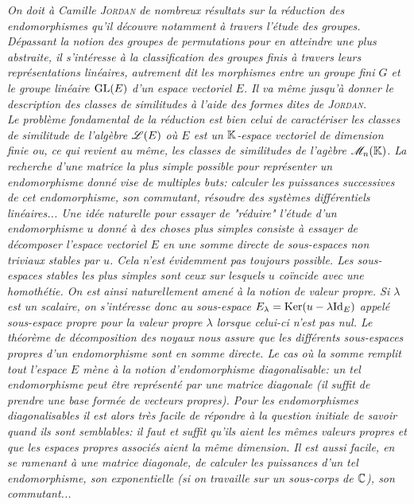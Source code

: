\textsl{On doit à Camille \textsc{Jordan} de nombreux résultats sur la réduction des endomorphismes qu'il découvre notamment à travers l'étude des groupes. Dépassant la notion des groupes de permutations pour en atteindre une plus abstraite, il s'intéresse à la classification des groupes finis à travers leurs représentations linéaires, autrement dit les morphismes entre un groupe fini $G$ et le groupe linéaire $\mathrm{GL} (E)$ d'un espace vectoriel $E$. Il va même jusqu'à donner le description des classes de similitudes à l'aide des formes dites de \textsc{Jordan}.}\\
\textsl{Le problème fondamental de la réduction est bien celui de caractériser les classes de similitude de l'algèbre $\mathscr{L}(E)$ où $E$ est un $\mathbb{K}$-espace vectoriel de dimension finie ou, ce qui revient au même, les classes de similitudes de l'agèbre $\mathscr{M}_n(\mathbb{K})$. La recherche d'une matrice la plus simple possible pour représenter un endomorphisme donné vise de multiples buts: calculer les puissances successives de cet endomorphisme, son commutant, résoudre des systèmes différentiels linéaires... Une idée naturelle pour essayer de "réduire" l'étude d'un endomorphisme $u$ donné à des choses plus simples consiste à essayer de décomposer l'espace vectoriel $E$ en une somme directe de sous-espaces non triviaux stables par $u$. Cela n'est évidemment pas toujours possible. Les sous-espaces stables les plus simples sont ceux sur lesquels $u$ coïncide avec une homothétie. On est ainsi naturellement amené à la notion de valeur propre. Si $\lambda$ est un scalaire, on s'intéresse donc au sous-espace $E_\lambda = \mathrm{Ker}(u - \lambda \mathrm{Id}_E)$ appelé sous-espace propre pour la valeur propre $\lambda$ lorsque celui-ci n'est pas nul. Le théorème de décomposition des noyaux nous assure que les différents sous-espaces propres d'un endomorphisme sont en somme directe. Le cas où la somme remplit tout l'espace $E$ mène à la notion d'endomorphisme diagonalisable: un tel endomorphisme peut être représenté par une matrice diagonale (il suffit de prendre une base formée de vecteurs propres). Pour les endomorphismes diagonalisables il est alors très facile de répondre à la question initiale de savoir quand ils sont semblables: il faut et suffit qu'ils aient les mêmes valeurs propres et que les espaces propres associés aient la même dimension. Il est aussi facile, en se ramenant à une matrice diagonale, de calculer les puissances d'un tel endomorphisme, son exponentielle (si on travaille sur un sous-corps de $\mathbb{C}$), son commutant...} \\

